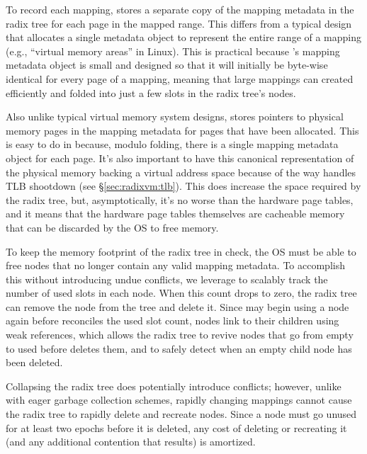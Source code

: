 To record each mapping, \vm stores a separate copy of the mapping metadata
in the radix tree for each page in the mapped range.  This differs
from a typical design that allocates a single metadata object
to represent the entire range of a mapping (e.g., ``virtual memory
areas'' in Linux).
%
This is practical because \vm's mapping metadata object is small and
designed so that it will initially be byte-wise
identical for every page of a mapping, meaning that large mappings can
created efficiently and folded into just a few slots in the radix
tree's nodes.

Also unlike typical virtual memory system designs, \vm stores pointers
to physical memory pages in the mapping metadata for pages that have
been allocated.  This is easy to do in \vm because, modulo folding,
there is a single mapping metadata object for each page.  It's also
important to have this canonical representation of the physical memory
backing a virtual address space because of the way \vm handles TLB
shootdown (see \S\ref{sec:radixvm:tlb}).  This does increase the space
required by the radix tree, but, asymptotically, it's no worse than
the hardware page tables, and it means that the hardware page tables
themselves are cacheable memory that can be discarded by the OS to
free memory.

To keep the memory footprint of the radix tree in check, the OS must be
able to free nodes that no longer contain any valid mapping metadata.
To accomplish this without introducing undue conflicts, we leverage
 to scalably track the number of used slots in each node.
When this count drops to zero, the radix tree can remove the node from
the tree and delete it.  Since \vm may begin using a node again before
 reconciles the used slot count, nodes link to their children
using weak references, which allows the radix tree to revive nodes
that go from empty to used before  deletes them, and to
safely detect when an empty child node has been deleted.

Collapsing the radix tree does potentially introduce conflicts;
however, unlike with eager garbage collection schemes, rapidly
changing
mappings cannot cause the radix tree to rapidly delete and recreate
nodes.  Since a node must go unused for at least two  epochs
before it is deleted, any cost of deleting or recreating it (and any
additional contention that results) is amortized.

